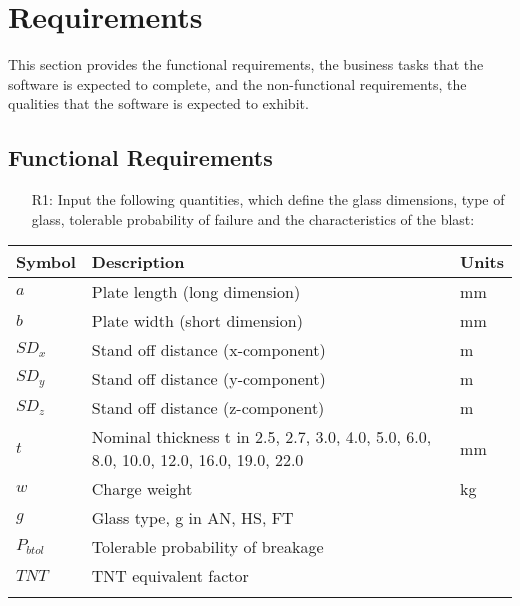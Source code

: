 \documentclass[12pt]{article}
\begin{document}
\section{Requirements}
\label{Sec:Requ}
This section provides the functional requirements, the business tasks that the software is expected to complete, and the non-functional requirements, the qualities that the software is expected to exhibit.
\subsection{Functional Requirements}
\label{Sec:FuncRequ}
\begin{itemize}
\item[R1:]Input the following quantities, which define the glass dimensions, type of glass, tolerable probability of failure and the characteristics of the blast:
\end{itemize}
\begin{longtable*}{l l l}
\toprule
Symbol & Description & Units
\\
\midrule
$a$ & Plate length (long dimension) & mm
\\
$b$ & Plate width (short dimension) & mm
\\
$SD_{x}$ & Stand off distance (x-component) & m
\\
$SD_{y}$ & Stand off distance (y-component) & m
\\
$SD_{z}$ & Stand off distance (z-component) & m
\\
$t$ & Nominal thickness t in {2.5, 2.7, 3.0, 4.0, 5.0, 6.0, 8.0, 10.0, 12.0, 16.0, 19.0, 22.0} & mm
\\
$w$ & Charge weight & kg
\\
$g$ & Glass type, g in {AN, HS, FT} & 
\\
$P_{btol}$ & Tolerable probability of breakage & 
\\
$TNT$ & TNT equivalent factor & 
\\
\bottomrule
\label{Table:TablofSymb}
\end{longtable*}
\end{document}

